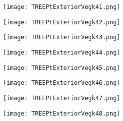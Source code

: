 \documentclass[pdf]{beamer}
\begin{document}
\begin{frame}
\begin{figure}[!h]
\centering
\texttt{[image: TREEPtExteriorVegk41.png]}
\end{figure}
\end{frame}

\begin{frame}
\begin{figure}[!h]
\centering
\texttt{[image: TREEPtExteriorVegk42.png]}
\end{figure}
\end{frame}

\begin{frame}
\begin{figure}[!h]
\centering
\texttt{[image: TREEPtExteriorVegk43.png]}
\end{figure}
\end{frame}

\begin{frame}
\begin{figure}[!h]
\centering
\texttt{[image: TREEPtExteriorVegk44.png]}
\end{figure}
\end{frame}

\begin{frame}
\begin{figure}[!h]
\centering
\texttt{[image: TREEPtExteriorVegk45.png]}
\end{figure}
\end{frame}

\begin{frame}
\begin{figure}[!h]
\centering
\texttt{[image: TREEPtExteriorVegk46.png]}
\end{figure}
\end{frame}

\begin{frame}
\begin{figure}[!h]
\centering
\texttt{[image: TREEPtExteriorVegk47.png]}
\end{figure}
\end{frame}

\begin{frame}
\begin{figure}[!h]
\centering
\texttt{[image: TREEPtExteriorVegk48.png]}
\end{figure}
\end{frame}
\end{document}
